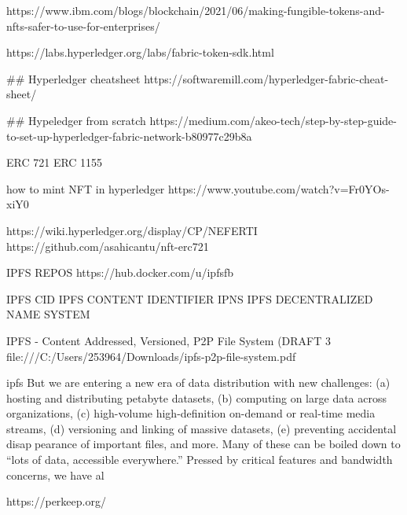 https://www.ibm.com/blogs/blockchain/2021/06/making-fungible-tokens-and-nfts-safer-to-use-for-enterprises/


https://labs.hyperledger.org/labs/fabric-token-sdk.html



## Hyperledger cheatsheet
https://softwaremill.com/hyperledger-fabric-cheat-sheet/    

## Hypeledger from scratch
https://medium.com/akeo-tech/step-by-step-guide-to-set-up-hyperledger-fabric-network-b80977c29b8a


ERC 721
ERC 1155


how to mint NFT in hyperledger
https://www.youtube.com/watch?v=Fr0YOs-xiY0

https://wiki.hyperledger.org/display/CP/NEFERTI
https://github.com/asahicantu/nft-erc721


IPFS REPOS
https://hub.docker.com/u/ipfsfb


IPFS CID IPFS CONTENT IDENTIFIER
IPNS IPFS DECENTRALIZED NAME SYSTEM

IPFS - Content Addressed, Versioned, P2P File System
(DRAFT 3
file:///C:/Users/253964/Downloads/ipfs-p2p-file-system.pdf

ipfs
But we are entering a
new era of data distribution with new challenges: (a) hosting
and distributing petabyte datasets, (b) computing on large
data across organizations, (c) high-volume high-definition
on-demand or real-time media streams, (d) versioning and
linking of massive datasets, (e) preventing accidental disappearance of important files, and more. Many of these can be
boiled down to “lots of data, accessible everywhere.” Pressed
by critical features and bandwidth concerns, we have al


https://perkeep.org/


